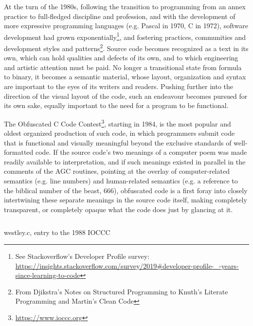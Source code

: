 At the turn of the 1980s, following the transition to programming from an annex practice to full-fledged discipline and profession, and with the development of more expressive programming languages (e.g. Pascal in 1970, C in 1972), software development had grown exponentially\footnote{See Stackoverflow's Developer Profile survey: \url{https://insights.stackoverflow.com/survey/2019\#developer-profile-_-years-since-learning-to-code}}, and fostering practices, communities and development styles and patterns\footnote{From Djikstra's Notes on Structured Programming to Knuth's Literate Programming and Martin's Clean Code}. Source code becomes recognized as a text in its own, which can hold qualities and defects of its own, and to which engineering and artistic attention must be paid. No longer a transitional state from formula to binary, it becomes a semantic material, whose layout, organization and syntax are important to the eyes of its writers and readers. Pushing further into the direction of the visual layout of the code, such an endeavour becomes pursued for its own sake, equally important to the need for a program to be functional.

The Obfuscated C Code Contest\footnote{\url{https://www.ioccc.org}}, starting in 1984, is the most popular and oldest organized production of such code, in which programmers submit code that is functional and visually meaningful beyond the exclusive standards of well-formatted code. If the source code's two meanings of a computer poem was made readily available to interpretation, and if such meanings existed in parallel in the comments of the AGC routines, pointing at the overlay of computer-related semantics (e.g. line numbers) and human-related semantics (e.g. a reference to the biblical number of the beast, 666), obfuscated code is a first foray into closely intertwining these separate meanings in the source code itself, making completely transparent, or completely opaque what the code does just by glancing at it.

\begin{listing}
  \inputminted{c}{./corpus/circle.c}
  \caption{westley.c, entry to the 1988 IOCCC}
  \label{code:circle_c}
\end{listing}

